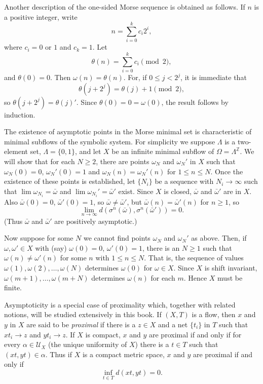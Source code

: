 Another description of the one-sided Morse sequence is obtained as follows. If $n$ is a positive integer, write
\[
    n = \sum_{i=0}^{k} c_i 2^i,
\]
where $c_i = 0$ or $1$ and $c_k = 1$. Let
\[
    \theta(n) = \sum_{i=0}^{k} c_i \pmod{2},
\]
and $\theta(0) = 0$. Then $\omega(n) = \theta(n)$. For, if $0 \le j < 2^j$, it is immediate that
\[
    \theta(j + 2^j) = \theta(j) + 1 \pmod{2},
\]
so $\theta(j + 2^j) = \theta(j)'$. Since $\theta(0) = 0 = \omega(0)$, the result follows by induction.

The existence of asymptotic points in the Morse minimal set is characteristic of minimal subflows of the symbolic system. For simplicity we suppose $\Lambda$ is a two-element set, $\Lambda = \{0,1\}$, and let $X$ be an infinite minimal subflow of $\Omega = \Lambda^{\mathbb{Z}}$. We will show that for each $N \ge 2$, there are points $\omega_N$ and $\omega_N'$ in $X$ such that $\omega_N(0) = 0$, $\omega_N'(0) = 1$ and $\omega_N(n) = \omega_N'(n)$ for $1 \le n \le N$. Once the existence of these points is established, let $\{N_i\}$ be a sequence with $N_i \to \infty$ such that $\lim \omega_{N_i} = \bar{\omega}$ and $\lim \omega_{N_i}' = \bar{\omega}'$ exist. Since $X$ is closed, $\bar{\omega}$ and $\bar{\omega}'$ are in $X$. Also $\bar{\omega}(0) = 0$, $\bar{\omega}'(0) = 1$, so $\bar{\omega} \ne \bar{\omega}'$, but $\bar{\omega}(n) = \bar{\omega}'(n)$ for $n \ge 1$, so
\[
    \lim_{n \to \infty} d(\sigma^n(\bar{\omega}), \sigma^n(\bar{\omega}')) = 0.
\]
(Thus $\bar{\omega}$ and $\bar{\omega}'$ are positively asymptotic.)

Now suppose for some $N$ we cannot find points $\omega_N$ and $\omega_N'$ as above. Then, if $\omega, \omega' \in X$ with (say) $\omega(0) = 0$, $\omega'(0) = 1$, there is an $N \ge 1$ such that $\omega(n) \ne \omega'(n)$ for some $n$ with $1 \le n \le N$. That is, the sequence of values $\omega(1), \omega(2), \ldots, \omega(N)$ determines $\omega(0)$ for $\omega \in X$. Since $X$ is shift invariant, $\omega(m+1), \ldots, \omega(m+N)$ determines $\omega(n)$ for each $m$. Hence $X$ must be finite.

Asymptoticity is a special case of proximality which, together with related notions, will be studied extensively in this book. If $(X, T)$ is a flow, then $x$ and $y$ in $X$ are said to be \textit{proximal} if there is a $z \in X$ and a net $\{t_i\}$ in $T$ such that $x t_i \to z$ and $y t_i \to z$. If $X$ is compact, $x$ and $y$ are proximal if and only if for every $\alpha \in \mathcal{U}_X$ (the unique uniformity of $X$) there is a $t \in T$ such that $(x t, y t) \in \alpha$. Thus if $X$ is a compact metric space, $x$ and $y$ are proximal if and only if
\[
    \inf_{t \in T} d(x t, y t) = 0.
\]

